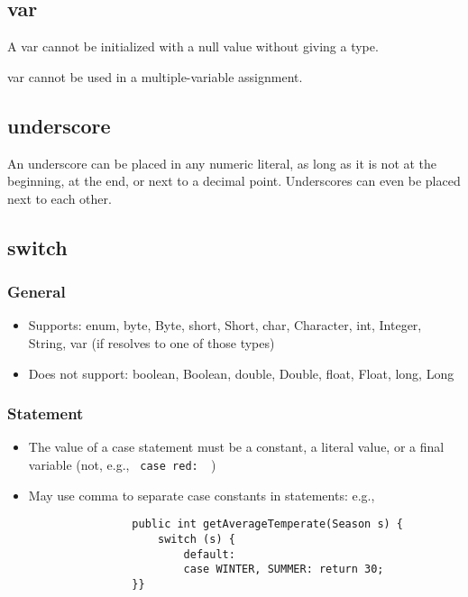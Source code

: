 \documentclass{scrartcl}
\begin{document}
\subsection{var}

    A var cannot be initialized with a null value without giving a type.

    var cannot be used in a multiple-­variable assignment.

\subsection{underscore}

    An underscore can be placed in any numeric literal, as long as it is not at the beginning, at the end, or next to a decimal point. Underscores can even be placed next to each other.

\subsection{switch}

\subsubsection{General}

        \begin{itemize}
            \item Supports: enum, byte, Byte, short, Short, char, Character, int, Integer,
            String, var (if resolves to one of those types)
            \item Does not support: boolean, Boolean, double, Double, float, Float, long, Long
         \end{itemize}

\subsubsection{Statement}

    \begin{itemize}
        \item The value of a case statement must be a constant, a literal value, or a final variable (not, e.g., \lstinline$ case red:  $)
        \item May use comma to separate case constants in statements: e.g.,
            \begin{lstlisting}
                public int getAverageTemperate(Season s) {
                    switch (s) {
                        default:
                        case WINTER, SUMMER: return 30;
                }}
            \end{lstlisting}
    \end{itemize}
\end{document}
